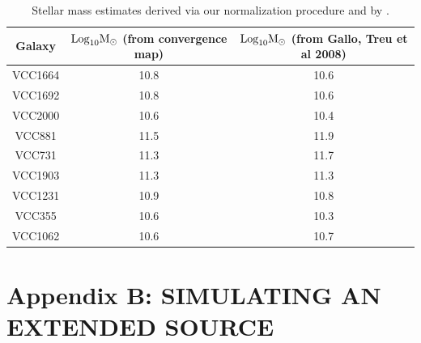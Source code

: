 \begin{table}
	\centering
	\label{table:stellar_mass}
	\caption{Stellar mass estimates derived via our normalization procedure and by \cite{Gallo++08}.}
	\begin{tabular}{c c c}
		\hline
		Galaxy & $\rm{Log}_{10} M_{\odot}$ (from convergence map) & $\rm{Log}_{10} M_{\odot}$ (from Gallo, Treu et al 2008)\\
		\hline
		VCC1664 & 10.8 & 10.6 \\
		VCC1692 & 10.8 & 10.6 \\
		VCC2000 & 10.6 & 10.4 \\
		VCC881 & 11.5 & 11.9 \\
		VCC731 & 11.3 & 11.7 \\
		VCC1903 & 11.3 & 11.3 \\ 
		VCC1231 & 10.9 & 10.8 \\ 
		VCC355 & 10.6 & 10.3 \\
		VCC1062 & 10.6 & 10.7 \\
		\hline 
	\end{tabular}
\end{table}

\section{Appendix B: SIMULATING AN EXTENDED SOURCE}
\label{app:B}

